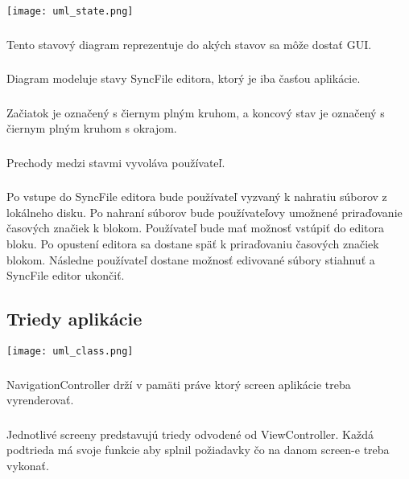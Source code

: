 \documentclass{article}
\begin{document}
\texttt{[image: uml\_state.png]}

\subsubsection{}
Tento stavový diagram reprezentuje do akých stavov sa môže dostať GUI. 

\subsubsection{}
Diagram modeluje stavy SyncFile editora, ktorý je iba časťou aplikácie.

\subsubsection{}
Začiatok je označený s čiernym plným kruhom, a koncový stav je označený s čiernym plným kruhom s okrajom. 

\subsubsection{}
Prechody medzi stavmi vyvoláva používateľ.

\subsubsection{}
Po vstupe do SyncFile editora bude používateľ vyzvaný k nahratiu súborov z lokálneho disku. 
Po nahraní súborov bude používateľovy umožnené priraďovanie časových značiek k blokom.
Používateľ bude mať možnosť vstúpiť do editora bloku. 
Po opustení editora sa dostane späť k priraďovaniu časových značiek blokom.
Následne používateľ dostane možnosť edivované súbory stiahnuť a SyncFile editor ukončiť.

\subsection{Triedy aplikácie}

\texttt{[image: uml\_class.png]}

\subsubsection{}
NavigationController drží v pamäti práve ktorý screen aplikácie treba vyrenderovať.

\subsubsection{}
Jednotlivé screeny predstavujú triedy odvodené od ViewController.
Každá podtrieda má svoje funkcie aby splnil požiadavky čo na danom screen-e treba vykonať.
\end{document}
